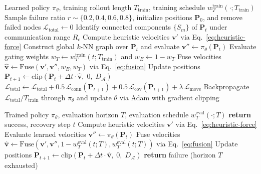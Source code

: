 \documentclass[11pt]{article}
\theoremstyle{plain}
\theoremstyle{definition}
\theoremstyle{remark}
\begin{document}
\begin{algorithm}[t]
\caption{HAC Differentiable Rollout Training (One Epoch)}
\label{alg:hac-train}
\begin{algorithmic}[1]
\Require Learned policy $\pi_\theta$, training rollout length $T_{\mathrm{train}}$, training schedule $w_T^{\mathrm{train}}(\cdot; T_{\mathrm{train}})$
\State Sample failure ratio $r \sim \{0.2, 0.4, 0.6, 0.8\}$, initialize positions $\mathbf{P}_0$, and remove failed nodes
\State $\mathcal{L}_{\text{total}} \gets 0$
  \State Identify connected components $\{S_m\}$ of $\mathbf{P}_t$ under communication range $R_c$
  \State Compute heuristic velocities $\mathbf{v}'$ via Eq.~\eqref{eq:heuristic-force} 
  \State Construct global $k$-NN graph over $\mathbf{P}_t$ and evaluate $\mathbf{v}'' \gets \pi_\theta(\mathbf{P}_t)$ 
  \State Evaluate gating weights $w_T \gets w_T^{\mathrm{train}}(t; T_{\mathrm{train}})$ and $w_E \gets 1 - w_T$
  \State Fuse velocities $\hat{\mathbf{v}} \gets \text{Fuse}(\mathbf{v}', \mathbf{v}'', w_E, w_T)$ via Eq.~\eqref{eq:fusion}
  \State Update positions $\mathbf{P}_{t+1} \gets \text{clip}(\mathbf{P}_t + \Delta t \cdot \hat{\mathbf{v}}, \; 0, \; D_{\mathcal{A}})$
  \State $\mathcal{L}_{\text{total}} \gets \mathcal{L}_{\text{total}} + 0.5\,\mathcal{L}_{\mathrm{conn}}(\mathbf{P}_{t+1}) + 0.5\,\mathcal{L}_{\mathrm{cov}}(\mathbf{P}_{t+1}) + \lambda\,\mathcal{L}_{\mathrm{move}}$
\EndFor
\State Backpropagate $\mathcal{L}_{\text{total}} / T_{\mathrm{train}}$ through $\pi_\theta$ and update $\theta$ via Adam with gradient clipping
\end{algorithmic}
\end{algorithm}

\begin{algorithm}[t]
\caption{HAC Inference Deployment Rollout}
\label{alg:hac-deploy}
\begin{algorithmic}[1]
\Require Trained policy $\pi_\theta$, evaluation horizon $T$, evaluation schedule $w_T^{\mathrm{eval}}(\cdot; T)$
   \textbf{return} success, recovery step $t$
  \EndIf
  \State Compute heuristic velocities $\mathbf{v}'$ via Eq.~\eqref{eq:heuristic-force}
  \State Evaluate learned velocities $\mathbf{v}'' \gets \pi_\theta(\mathbf{P}_t)$ 
  \State Fuse velocities $\hat{\mathbf{v}} \gets \text{Fuse}(\mathbf{v}', \mathbf{v}'', 1-w_T^{\mathrm{eval}}(t; T), w_T^{\mathrm{eval}}(t; T))$ via Eq.~\eqref{eq:fusion}
  \State Update positions $\mathbf{P}_{t+1} \gets \text{clip}(\mathbf{P}_t + \Delta t \cdot \hat{\mathbf{v}}, \; 0, \; D_{\mathcal{A}})$
\EndFor
\State \textbf{return} failure (horizon $T$ exhausted)
\end{algorithmic}
\end{algorithm}
\end{document}
